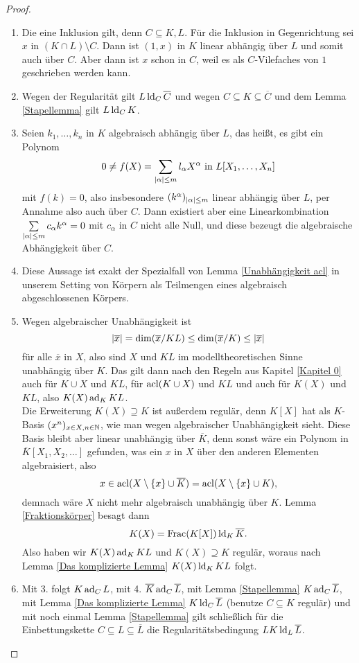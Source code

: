     \begin{proof}
    	\ 
    	\begin{enumerate}
    		\item Die eine Inklusion gilt, denn $C\subseteq K,L$. Für die Inklusion in Gegenrichtung sei $x$ in $(K\cap L)\setminus C$. Dann ist $(1,x)$ in $K$ linear abhängig über $L$ und somit auch über $C$. Aber dann ist $x$ schon in $C$, weil es als $C$-Vilefaches von $1$ geschrieben werden kann.
    		\item Wegen der Regularität gilt $L\operatorname{ld}_C\overline{C}$ und wegen $C\subseteq K\subseteq\overline{C}$ und dem Lemma \ref{Stapellemma} gilt $L\operatorname{ld}_C K$.
    		\item Seien $k_1,\dots,k_n$ in $K$ algebraisch abhängig über $L$, das heißt, es gibt ein Polynom $$0\neq f(X)=\sum\limits_{{\left| \alpha \right|}\leq m}l_\alpha X^\alpha\text{ in }L[X_1,\dots,X_n]$$ mit $f(k)=0$, also insbesondere $(k^\alpha)_{{\left| \alpha \right|}\leq m}$ linear abhängig über $L$, per Annahme also auch über $C$. Dann existiert aber eine Linearkombination $\sum\limits_{{\left| \alpha \right|}\leq m}c_\alpha k^\alpha=0$ mit $c_\alpha$ in $C$ nicht alle Null, und diese bezeugt die algebraische Abhängigkeit über $C$.
    		\item Diese Aussage ist exakt der Spezialfall von Lemma \ref{Unabhängigkeit acl} in unserem Setting von Körpern als Teilmengen eines algebraisch abgeschlossenen Körpers.
    		\item Wegen algebraischer Unabhängigkeit ist $${\left| \overline{x} \right|}=\dim(\overline{x}/KL)\leq\dim(\overline{x}/K)\leq{\left| \overline{x} \right|}$$ für alle $\overline{x}$ in $X$, also sind $X$ und $KL$ im modelltheoretischen Sinne unabhängig über $K$. Das gilt dann nach den Regeln aus Kapitel \ref{Kapitel 0} auch für $K\cup X$ und $KL$, für $\operatorname{acl}(K\cup X)$ und $KL$ und auch für $K(X)$ und $KL$, also $K(X)\operatorname{ad}_KKL$.\\
    		Die Erweiterung $K(X)\supseteq K$ ist außerdem regulär, denn $K[X]$ hat als $K$-Basis $(x^n)_{x\in X,n\in\mathbb{N}}$, wie man wegen algebraischer Unabhängigkeit sieht. Diese Basis bleibt aber linear unabhängig über $\overline{K}$, denn sonst wäre ein Polynom in $\overline{K}[X_1,X_2,\dots]$ gefunden, was ein $x$ in $X$ über den anderen Elementen algebraisiert, also $$x\in\operatorname{acl}(X\setminus\{x\}\cup\overline{K})=\operatorname{acl}(X\setminus\{x\}\cup K),$$ demnach wäre $X$ nicht mehr algebraisch unabhängig über $K$. Lemma \ref{Fraktionskörper} besagt dann $$K(X)=\operatorname{Frac}(K[X])\operatorname{ld}_K\overline{K}.$$
    		Also haben wir $K(X)\operatorname{ad}_KKL$ und $K(X)\supseteq K$ regulär, woraus nach Lemma \ref{Das komplizierte Lemma} $K(X)\operatorname{ld}_KKL$ folgt.
    		\item Mit 3. folgt $K\operatorname{ad}_CL$, mit 4. $\overline{K}\operatorname{ad}_C\overline{L}$, mit Lemma \ref{Stapellemma} $K\operatorname{ad}_C\overline{L}$, mit Lemma \ref{Das komplizierte Lemma} $K\operatorname{ld}_C\overline{L}$ (benutze $C\subseteq K$ regulär) und mit noch einmal Lemma \ref{Stapellemma} gilt schließlich für die Einbettungskette $C\subseteq L\subseteq\overline{L}$ die Regularitätsbedingung $LK\operatorname{ld}_L\overline{L}$.
    	\end{enumerate}
    \end{proof}
    
